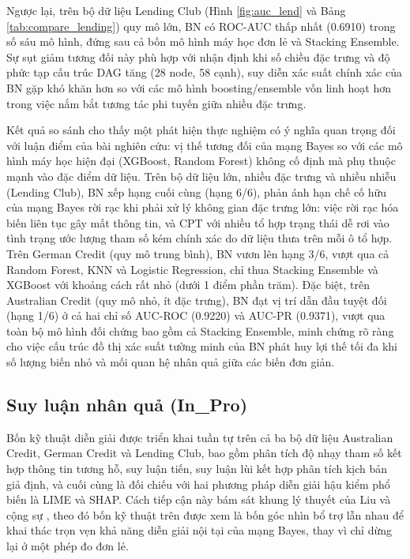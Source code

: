 \FloatBarrier

Ngược lại, trên bộ dữ liệu Lending Club (Hình \ref{fig:auc_lend} và Bảng \ref{tab:compare_lending}) quy mô lớn, BN có ROC-AUC thấp nhất (0.6910) trong số sáu mô hình, đứng sau cả bốn mô hình máy học đơn lẻ và Stacking Ensemble. Sự sụt giảm tương đối này phù hợp với nhận định khi số chiều đặc trưng và độ phức tạp cấu trúc DAG tăng (28 node, 58 cạnh), suy diễn xác suất chính xác của BN gặp khó khăn hơn so với các mô hình boosting/ensemble vốn linh hoạt hơn trong việc nắm bắt tương tác phi tuyến giữa nhiều đặc trưng.

Kết quả so sánh cho thấy một phát hiện thực nghiệm có ý nghĩa quan trọng đối với luận điểm của bài nghiên cứu: vị thế tương đối của mạng Bayes so với các mô hình máy học hiện đại (XGBoost, Random Forest) không cố định mà phụ thuộc mạnh vào đặc điểm dữ liệu. Trên bộ dữ liệu lớn, nhiều đặc trưng và nhiều nhiễu (Lending Club), BN xếp hạng cuối cùng (hạng 6/6), phản ánh hạn chế cố hữu của mạng Bayes rời rạc khi phải xử lý không gian đặc trưng lớn: việc rời rạc hóa biến liên tục gây mất thông tin, và CPT với nhiều tổ hợp trạng thái dễ rơi vào tình trạng ước lượng tham số kém chính xác do dữ liệu thưa trên mỗi ô tổ hợp. Trên German Credit (quy mô trung bình), BN vươn lên hạng 3/6, vượt qua cả Random Forest, KNN và Logistic Regression, chỉ thua Stacking Ensemble và XGBoost với khoảng cách rất nhỏ (dưới 1 điểm phần trăm). Đặc biệt, trên Australian Credit (quy mô nhỏ, ít đặc trưng), BN đạt vị trí dẫn đầu tuyệt đối (hạng 1/6) ở cả hai chỉ số AUC-ROC (0.9220) và AUC-PR (0.9371), vượt qua toàn bộ mô hình đối chứng bao gồm cả Stacking Ensemble, minh chứng rõ ràng cho việc cấu trúc đồ thị xác suất tường minh của BN phát huy lợi thế tối đa khi số lượng biến nhỏ và mối quan hệ nhân quả giữa các biến đơn giản.

\subsection{Suy luận nhân quả (In\_Pro)}
\noindent
Bốn kỹ thuật diễn giải được triển khai tuần tự trên cả ba bộ dữ liệu Australian Credit, German Credit và Lending Club, bao gồm phân tích độ nhạy tham số kết hợp thông tin tương hỗ, suy luận tiến, suy luận lùi kết hợp phân tích kịch bản giả định, và cuối cùng là đối chiếu với hai phương pháp diễn giải hậu kiểm phổ biến là LIME và SHAP. Cách tiếp cận này bám sát khung lý thuyết của Liu và cộng sự \cite{liu2024credit}, theo đó bốn kỹ thuật trên được xem là bốn góc nhìn bổ trợ lẫn nhau để khai thác trọn vẹn khả năng diễn giải nội tại của mạng Bayes, thay vì chỉ dừng lại ở một phép đo đơn lẻ.

